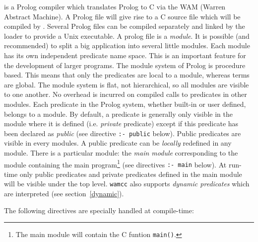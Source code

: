 {\wamcc} is a Prolog compiler which translates Prolog to C via the WAM 
(Warren Abstract Machine). A Prolog file will give rise to a C source
file which will be compiled by {\gcc}. Several Prolog files can be
compiled separately and linked by the loader to provide a Unix
executable. A prolog file is a {\em module}. It is possible (and
recommended) to split a big application into several little modules.
Each module has its own independent predicate name space.  This is an
important feature for the development of larger programs.  The module
system of {\wamcc} Prolog is procedure based.  This  means that only
the predicates are local to a module, whereas terms are global.  The
module system is flat, not hierarchical, so all modules are visible to
one another.   
No overhead is incurred on compiled calls to predicates in other modules.
Each predicate in the Prolog system, whether built-in or user defined,
belongs to a module.  By default, a predicate is
generally only visible in the module where it is defined (i.e. {\em
private} predicate) except if this predicate has been declared as {\em
public} (see directive {\tt :- public} below). Public predicates are visible
in every modules. A public predicate can be {\em locally} redefined
in any module. There is a particular module: the {\em main module}
corresponding to the module containing the main program\footnote{The
main module will contain the C funtion {\tt main()}.} (see directives
{\tt :- main} below). At run-time only public predicates and private
predicates defined in the main module will be visible under the
top level. {\tt wamcc} also supports {\em dynamic predicates} which
are interpreted (see section~\ref{dynamic}).


The following directives are specially handled at compile-time:~\\

